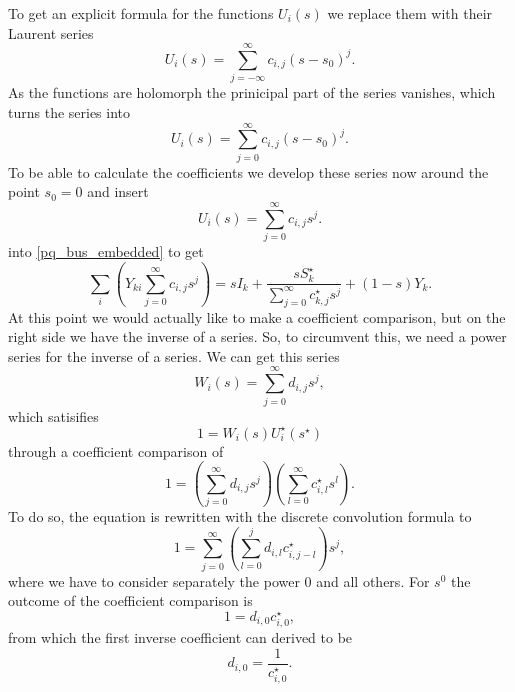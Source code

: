 To get an explicit formula for the functions $U_i(s)$ we replace them with their Laurent series
\begin{equation}
	U_i(s) = \sum_{j = -\infty}^\infty c_{i,j} (s - s_0)^j.
\end{equation}
As the functions are holomorph the prinicipal part of the series vanishes, which turns the series into
\begin{equation}
	U_i(s) = \sum_{j = 0}^\infty c_{i,j} (s - s_0)^j.
\end{equation}
To be able to calculate the coefficients we develop these series now around the point $s_0 = 0$ and insert
\begin{equation}
	U_i(s) = \sum_{j = 0}^\infty c_{i,j} s^j.
\end{equation}
 into \eqref{pq_bus_embedded} to get
\begin{equation}
		\sum_i \left( Y_{ki} \sum_{j = 0}^\infty c_{i,j} s^j \right) = s I_k + \frac{s S_k^\star}{\sum_{j = 0}^\infty c_{k,j}^\star s^j} + (1 - s) Y_k.
		\label{eq:helm_series_pq_bus}
\end{equation}
At this point we would actually like to make a coefficient comparison, but on the right side we have the inverse of a series. So, to circumvent this, we need a power series for the inverse of a series. We can get this series
\begin{equation}
	W_i(s) = \sum_{j = 0}^\infty d_{i,j} s^j,
\end{equation}
which satisifies
\begin{equation}
	1 = W_i(s) U_i^\star(s^\star)
\end{equation}
through a coefficient comparison of
\begin{equation}
	1 = \left( \sum_{j = 0}^\infty d_{i,j} s^j \right) \left( \sum_{l = 0}^\infty c_{i,l}^\star s^l \right).
\end{equation}
To do so, the equation is rewritten with the discrete convolution formula to
\begin{equation}
	1 = \sum_{j = 0}^\infty \left( \sum_{l = 0}^j d_{i,l} c_{i,j - l}^\star \right) s^j,
\end{equation}
where we have to consider separately the power 0 and all others. For $s^0$ the outcome of the coefficient comparison is
\begin{equation}
	1 = d_{i,0} c_{i,0}^\star,
\end{equation}
from which the first inverse coefficient can derived to be
\begin{equation}
	d_{i,0} = \frac{1}{c_{i,0}^\star}.
\end{equation}

